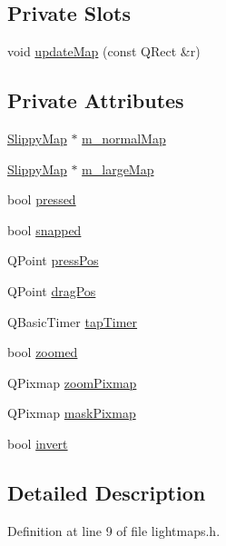 \subsection*{Private Slots}
\begin{DoxyCompactItemize}
\item 
void \hyperlink{classLightMaps_ae5e717309f666a3462cf5c5f5c5fbe43}{update\-Map} (const Q\-Rect \&r)
\end{DoxyCompactItemize}
\subsection*{Private Attributes}
\begin{DoxyCompactItemize}
\item 
\hyperlink{classSlippyMap}{Slippy\-Map} $\ast$ \hyperlink{classLightMaps_a62539ec15fdc3559461cfa5b80ed3f84}{m\-\_\-normal\-Map}
\item 
\hyperlink{classSlippyMap}{Slippy\-Map} $\ast$ \hyperlink{classLightMaps_a46a1d64c4860e7bdeec5d3dc23b5b66a}{m\-\_\-large\-Map}
\item 
bool \hyperlink{classLightMaps_a3de175af7a5611709dd46895b5b2baf7}{pressed}
\item 
bool \hyperlink{classLightMaps_a573f99d2f902a8b0b53ec7f7a5207775}{snapped}
\item 
Q\-Point \hyperlink{classLightMaps_a938551c74aa20bfb6896a46ea1437c79}{press\-Pos}
\item 
Q\-Point \hyperlink{classLightMaps_aa848f52d9b220d969605564bbba30005}{drag\-Pos}
\item 
Q\-Basic\-Timer \hyperlink{classLightMaps_a5a537b004e79b6d8667d5550c0e3af07}{tap\-Timer}
\item 
bool \hyperlink{classLightMaps_a3ecc8b8c64dfe20dd5bdfc7974ac48e3}{zoomed}
\item 
Q\-Pixmap \hyperlink{classLightMaps_a5a3f56996f498669ecd48b2670c3937f}{zoom\-Pixmap}
\item 
Q\-Pixmap \hyperlink{classLightMaps_a3a24ed88ec215d755ab8a2255b61ebf0}{mask\-Pixmap}
\item 
bool \hyperlink{classLightMaps_af4784df46ac3c6cf085e48811cc367b6}{invert}
\end{DoxyCompactItemize}


\subsection{Detailed Description}


Definition at line 9 of file lightmaps.\-h.



